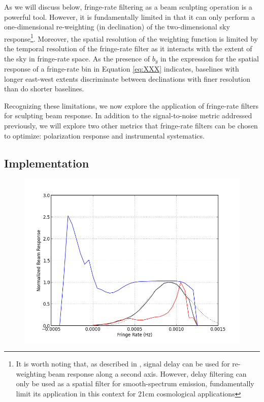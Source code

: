 \documentclass[twocolumn,apj,numberedappendix]{emulateapj}
\begin{document}
As we will discuss below, fringe-rate filtering as a beam sculpting operation is a powerful tool.  However, it
is fundamentally limited in that it can only perform a one-dimensional re-weighting (in declination) of 
the two-dimensional sky response\footnote{It is worth noting that, as described in \citet{parsons_backer2009},
signal delay can be used for re-weighting beam response along a second axis.  However, delay filtering can only
be used as a spatial filter for smooth-spectrum emission, fundamentally limit its application in this
context for 21cm cosmological applications}.  Moreover, the spatial resolution of the weighting function is limited by
the temporal resolution of the fringe-rate filter as it interacts with the extent of the sky in fringe-rate space.
As the presence of $b_y$ in the expression for the spatial response of a fringe-rate bin in Equation \ref{eq:XXX} indicates,
baselines with longer east-west extents discriminate between declinations with finer resolution than do shorter
baselines.

Recognizing these limitations, we now explore the application of fringe-rate filters for sculpting beam response.
In addition to the signal-to-noise metric addressed previously, we will explore two other metrics that fringe-rate
filters can be chosen to optimize: polarization response and instrumental systematics.

\subsection{Implementation}

\begin{figure}\centering
\includegraphics[width=.9\columnwidth]{plots/fringe_wgts.png}
\caption{
}\label{fig:fringe_wgts}
\end{figure}
\end{document}
